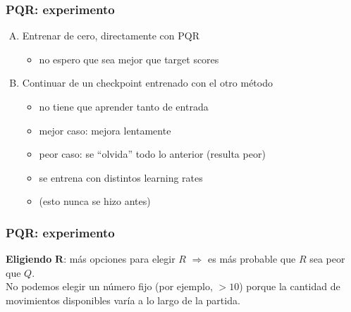 \begin{frame}
\frametitle{PQR: experimento}
\begin{enumerate}[A.]
\item Entrenar de cero, directamente con PQR
\begin{itemize}
\item no espero que sea mejor que target scores
\end{itemize}
\pause
\item Continuar de un checkpoint entrenado con el otro método
\begin{itemize}
\item no tiene que aprender tanto de entrada
\item mejor caso: mejora lentamente
\item peor caso: se \enquote{olvida} todo lo anterior (resulta peor)
\item se entrena con distintos learning rates
\item (esto nunca se hizo antes)
\end{itemize}
\end{enumerate}
\end{frame}


\begin{frame}
\frametitle{PQR: experimento}
\textbf{Eligiendo} $\mathbf{R}$: más opciones para elegir $R$ $\Rightarrow$ es más probable que $R$ sea peor que $Q$.
\\
\pause
No podemos elegir un número fijo (por ejemplo, $> 10$) porque la cantidad de movimientos disponibles varía a lo largo de la partida.
\pause
\begin{figure}[H]
\centering
{}
\end{figure}
\end{frame}

